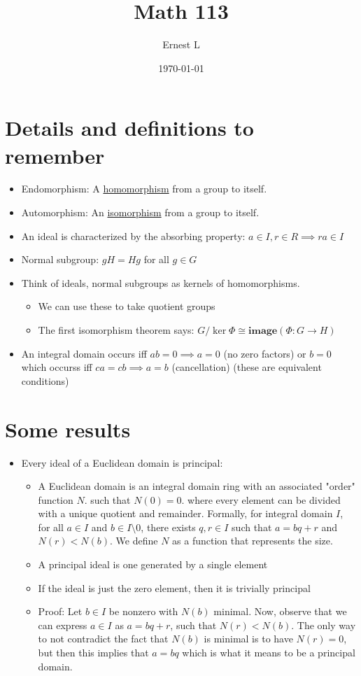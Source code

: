 \documentclass[11pt]{article}
\author{Ernest L}
\date{\today}
\title{Math 113}
\begin{document}
\maketitle
\section{Details and definitions to remember}

\begin{itemize}
    \item Endomorphism: A \underline{homomorphism} from a group to itself.
    \item Automorphism: An \underline{isomorphism} from a group to itself.
    \item An ideal is characterized by the absorbing property: $a \in I, r \in R \implies ra \in I$
    \item Normal subgroup: $gH = Hg$ for all $g \in G$
    \item Think of ideals, normal subgroups as kernels of homomorphisms.
    \begin{itemize}
        \item We can use these to take quotient groups 
        \item The first isomorphism theorem says: $G/\ker \Phi \cong \textbf{image} (\Phi: G \to H)$
    \end{itemize}
    \item An integral domain occurs iff $ab = 0 \implies a = 0$ (no zero factors) or $b = 0$ which occurss iff $ca = cb \implies a = b$ (cancellation) (these are equivalent conditions)
\end{itemize}

\newpage
\section{Some results}
\begin{itemize}
    \item Every ideal of a Euclidean domain is principal:
        \begin{itemize}
            \item A Euclidean domain is an integral domain ring with an associated "order" function $N$. such that $N(0) = 0$. where every element can be divided with a unique quotient and remainder. Formally, for integral domain $I$, for all $a \in I$ and $b \in I \setminus 0$, there exists $q, r \in I$ such that $a = bq + r$ and $N(r) < N(b)$. We define $N$ as a function that represents the size. 
            \item A principal ideal is one generated by a single element
            \item If the ideal is just the zero element, then it is trivially principal
            \item Proof: Let $b \in I$ be nonzero with $N(b)$ minimal. Now, observe that we can express $a \in I$ as $a = bq + r$, such that $N(r) < N(b)$. The only way to not contradict the fact that $N(b)$ is minimal is to have $N(r) = 0$, but then this implies that $a = bq$ which is what it means to be a principal domain.
        \end{itemize}
\end{itemize}
\end{document}
